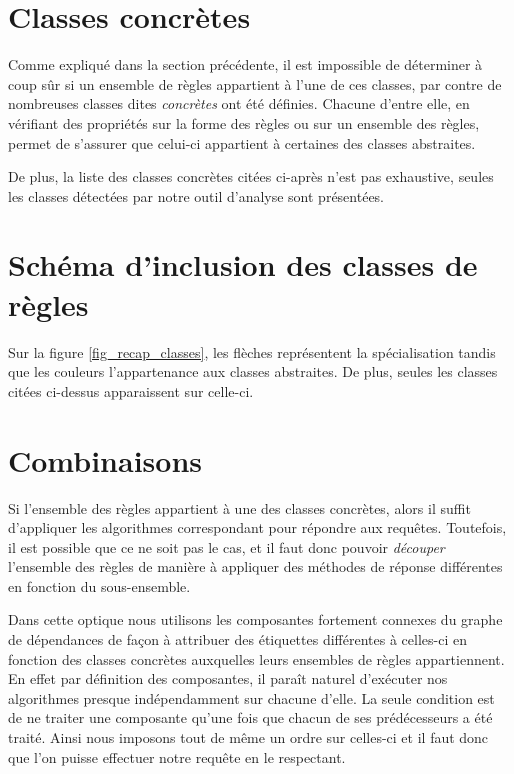 \section{Classes concrètes}\label{classes_concretes}
Comme expliqué dans la section précédente, il est impossible de déterminer à coup sûr 
si un ensemble
de règles appartient à l'une de ces classes, par contre de nombreuses classes dites
{\em concrètes }
ont été définies. Chacune d'entre elle, en vérifiant des propriétés sur la forme des
règles ou sur un ensemble des règles, 
permet de s'assurer que celui-ci appartient à certaines des classes
abstraites.

De plus, la liste des classes concrètes citées ci-après n'est pas exhaustive, seules les
classes détectées par notre outil d'analyse sont présentées.



\section{Schéma d'inclusion des classes de règles}
Sur la figure \ref{fig_recap_classes}, les flèches représentent la spécialisation tandis
que les couleurs l'appartenance aux classes abstraites. De plus, seules les classes citées
ci-dessus apparaissent sur celle-ci.


\section{Combinaisons}\label{combine}
Si l'ensemble des règles appartient à une des classes concrètes, alors il suffit
d'appliquer les algorithmes correspondant pour répondre aux requêtes. Toutefois, il est
possible que ce ne soit pas le cas, et il faut donc pouvoir {\em découper} l'ensemble des
règles de manière à appliquer des méthodes de réponse différentes en fonction du
sous-ensemble.

Dans cette optique nous utilisons les composantes fortement connexes du graphe de
dépendances
de façon à attribuer des étiquettes différentes à celles-ci en fonction
des classes concrètes auxquelles leurs ensembles de règles appartiennent.
En effet par définition des composantes, il paraît naturel d'exécuter nos algorithmes
presque indépendamment sur chacune d'elle. La seule condition est de ne traiter une
composante qu'une fois que chacun de ses prédécesseurs a été traité.
Ainsi nous imposons tout de même un ordre sur celles-ci et il faut donc que l'on puisse
effectuer notre requête en le respectant.

